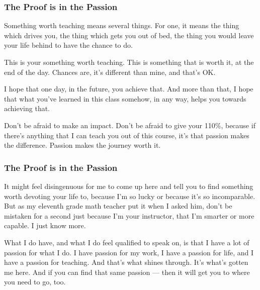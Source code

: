 \documentclass[aspectratio=169, handout]{beamer}
\begin{document}
\begin{frame}[fragile]
  \frametitle{The Proof is in the Passion}

  Something worth teaching means several things. For one, it means the thing
  which drives you, the thing which gets you out of bed, the thing you would
  leave your life behind to have the chance to do.

  \pause
  \vspace{\fill}

  This is your something worth teaching. This is something that is worth it, at
  the end of the day. Chances are, it’s different than mine, and that’s OK.

  \pause
  \vspace{\fill}

  I hope that one day, in the future, you achieve that. And more than that, I hope
  that what you’ve learned in this class somehow, in any way, helps you towards
  achieving that.

  \pause
  \vspace{\fill}

  Don’t be afraid to make an impact. Don’t be afraid to give your 110\%, because if
  there’s anything that I can teach you out of this course, it’s that passion
  makes the difference. Passion makes the journey worth it.
\end{frame}

\begin{frame}[fragile]
  \frametitle{The Proof is in the Passion}

  It might feel disingenuous for me to come up here and tell you to find
  something worth devoting your life to, because I’m so lucky or because it’s so
  incomparable. But as my eleventh grade math teacher put it when I asked him,
  don’t be mistaken for a second just because I’m your instructor, that I’m
  smarter or more capable. I just know more.

  \pause
  \vspace{\fill}

  What I do have, and what I do feel qualified to speak on, is that I have a lot
  of passion for what I do. I have passion for my work,  I have a passion for
  life, and I have a passion for teaching. And that’s what shines through. It’s
  what’s gotten me here. And if you can find that same passion — then it will
  get you to where you need to go, too.
\end{frame}

\begin{comment}
  I’m not a professor but if I had one thing to profess


    Something worth teaching means two things. It means my own personal journey in
    understanding why it was so important to be here, why it was so important that I
    come and teach this class.
    The other meaning is for you. It’s about you finding your purpose, your mission, your
    aspirations, your version of something worth teaching. What gets you out of bed
    in the morning.
    The third thing is you. You, as a class. Because you have been something
    worth teaching.
\end{comment}
\end{document}
